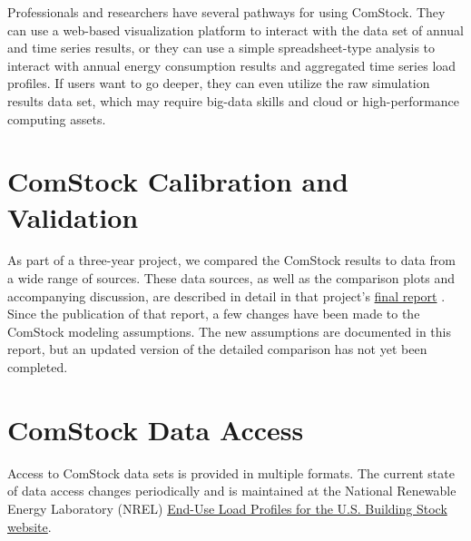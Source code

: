 Professionals and researchers have several pathways for using ComStock. They can use a web-based visualization platform to interact with the data set of annual and time series results, or they can use a simple spreadsheet-type analysis to interact with annual energy consumption results and aggregated time series load profiles. If users want to go deeper, they can even utilize the raw simulation results data set, which may require big-data skills and cloud or high-performance computing assets.

\section{ComStock Calibration and Validation}
As part of a three-year project, we compared the ComStock results to data from a wide range of sources. These data sources, as well as the comparison plots and accompanying discussion, are described in detail in that project's \href{https://www.nrel.gov/docs/fy22osti/80889.pdf}{final report} \citep{eulp_final_report}. Since the publication of that report, a few changes have been made to the ComStock modeling assumptions. The new assumptions are documented in this report, but an updated version of the detailed comparison has not yet been completed.

\section{ComStock Data Access}
Access to ComStock data sets is provided in multiple formats. The current state of data access changes periodically and is maintained at the National Renewable Energy Laboratory (NREL) \href{https://www.nrel.gov/buildings/end-use-load-profiles.html}{End-Use Load Profiles for the U.S. Building Stock website}.
